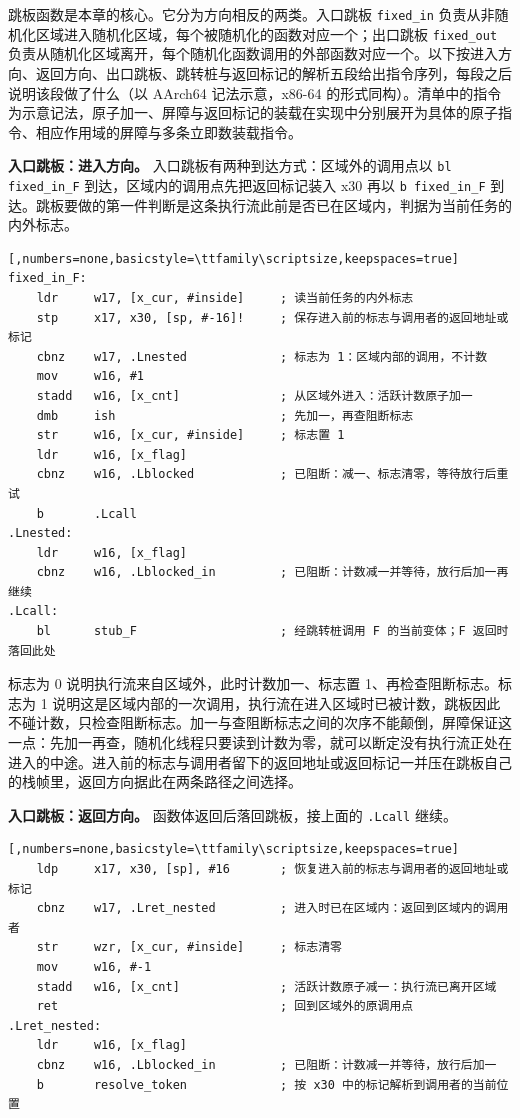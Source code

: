 跳板函数是本章的核心。它分为方向相反的两类。入口跳板 \lstinline[breaklines=false]@fixed_in@ 负责从非随机化区域进入随机化区域，每个被随机化的函数对应一个；出口跳板 \lstinline[breaklines=false]@fixed_out@ 负责从随机化区域离开，每个随机化函数调用的外部函数对应一个。以下按进入方向、返回方向、出口跳板、跳转桩与返回标记的解析五段给出指令序列，每段之后说明该段做了什么（以 AArch64 记法示意，x86-64 的形式同构）。清单中的指令为示意记法，原子加一、屏障与返回标记的装载在实现中分别展开为具体的原子指令、相应作用域的屏障与多条立即数装载指令。

\textbf{入口跳板：进入方向。} 入口跳板有两种到达方式：区域外的调用点以 \lstinline[breaklines=false]@bl fixed_in_F@ 到达，区域内的调用点先把返回标记装入 x30 再以 \lstinline[breaklines=false]@b fixed_in_F@ 到达。跳板要做的第一件判断是这条执行流此前是否已在区域内，判据为当前任务的内外标志。

\begin{lstlisting}[,numbers=none,basicstyle=\ttfamily\scriptsize,keepspaces=true]
fixed_in_F:
    ldr     w17, [x_cur, #inside]     ; 读当前任务的内外标志
    stp     x17, x30, [sp, #-16]!     ; 保存进入前的标志与调用者的返回地址或标记
    cbnz    w17, .Lnested             ; 标志为 1：区域内部的调用，不计数
    mov     w16, #1
    stadd   w16, [x_cnt]              ; 从区域外进入：活跃计数原子加一
    dmb     ish                       ; 先加一，再查阻断标志
    str     w16, [x_cur, #inside]     ; 标志置 1
    ldr     w16, [x_flag]
    cbnz    w16, .Lblocked            ; 已阻断：减一、标志清零，等待放行后重试
    b       .Lcall
.Lnested:
    ldr     w16, [x_flag]
    cbnz    w16, .Lblocked_in         ; 已阻断：计数减一并等待，放行后加一再继续
.Lcall:
    bl      stub_F                    ; 经跳转桩调用 F 的当前变体；F 返回时落回此处
\end{lstlisting}

标志为 0 说明执行流来自区域外，此时计数加一、标志置 1、再检查阻断标志。标志为 1 说明这是区域内部的一次调用，执行流在进入区域时已被计数，跳板因此不碰计数，只检查阻断标志。加一与查阻断标志之间的次序不能颠倒，屏障保证这一点：先加一再查，随机化线程只要读到计数为零，就可以断定没有执行流正处在进入的中途。进入前的标志与调用者留下的返回地址或返回标记一并压在跳板自己的栈帧里，返回方向据此在两条路径之间选择。

\textbf{入口跳板：返回方向。} 函数体返回后落回跳板，接上面的 \lstinline[breaklines=false]@.Lcall@ 继续。

\begin{lstlisting}[,numbers=none,basicstyle=\ttfamily\scriptsize,keepspaces=true]
    ldp     x17, x30, [sp], #16       ; 恢复进入前的标志与调用者的返回地址或标记
    cbnz    w17, .Lret_nested         ; 进入时已在区域内：返回到区域内的调用者
    str     wzr, [x_cur, #inside]     ; 标志清零
    mov     w16, #-1
    stadd   w16, [x_cnt]              ; 活跃计数原子减一：执行流已离开区域
    ret                               ; 回到区域外的原调用点
.Lret_nested:
    ldr     w16, [x_flag]
    cbnz    w16, .Lblocked_in         ; 已阻断：计数减一并等待，放行后加一
    b       resolve_token             ; 按 x30 中的标记解析到调用者的当前位置
\end{lstlisting}

